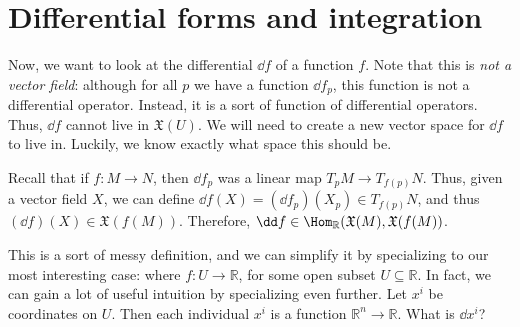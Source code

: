 \section{Differential forms and integration}

Now, we want to look at the differential $\dd f$ of a function $f$. Note that this is \emph{not a vector field}: although for all $p$ we have a function $\dd f_p$, this function is not a differential operator. Instead, it is a sort of function of differential operators. Thus, $\dd f$ cannot live in $\mathfrak{X}(U)$. We will need to create a new vector space for $\dd f$ to live in. Luckily, we know exactly what space this should be.

Recall that if $f : M \to N$, then $\dd f_p$ was a linear map $T_pM \to T_{f(p)} N$. Thus, given a vector field $X$, we can define $\dd f(X) = (\dd f_p)(X_p)\in T_{f(p)} N$, and thus $(\dd f)(X)\in \mathfrak{X} (f(M))$. Therefore, $\dd f\in \Hom_{\mathbb{R} }(\mathfrak{X} (M), \mathfrak{X} (f(M)) $.

This is a sort of messy definition, and we can simplify it by specializing to our most interesting case: where $f : U \to \mathbb{R} $, for some open subset $U\subseteq \mathbb{R} $. In fact, we can gain a lot of useful intuition by specializing even further. Let $x^i$ be coordinates on $U$. Then each individual $x^i$ is a function $\mathbb{R} ^n \to \mathbb{R} $. What is $\dd x^i$?

